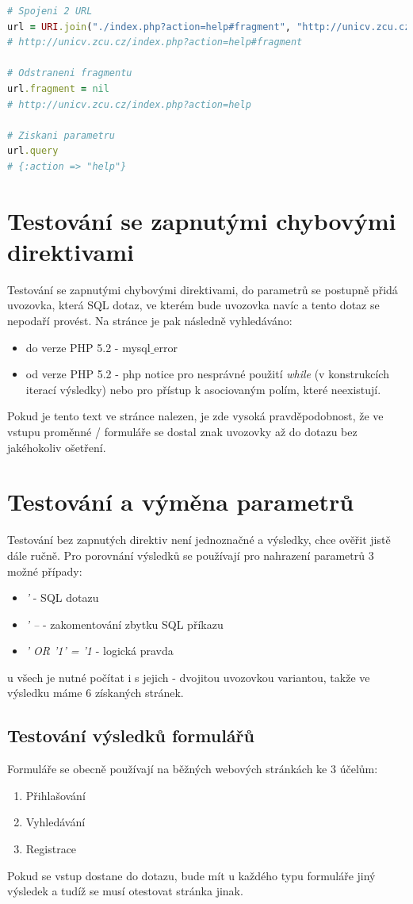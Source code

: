 \documentclass[12pt, a4paper]{report}
\begin{document}
\begin{lstlisting}[label=equals_classes,language=Ruby, caption=Normalizování URL přes uri a třídu URI]
# Spojeni 2 URL
url = URI.join("./index.php?action=help#fragment", "http://unicv.zcu.cz/") 
# http://unicv.zcu.cz/index.php?action=help#fragment

# Odstraneni fragmentu
url.fragment = nil
# http://unicv.zcu.cz/index.php?action=help

# Ziskani parametru
url.query
# {:action => "help"}
\end{lstlisting}

\section{Testování se zapnutými chybovými direktivami}
Testování se zapnutými chybovými direktivami, do parametrů se postupně přidá uvozovka, která  SQL dotaz, ve kterém bude uvozovka navíc a tento dotaz se nepodaří provést. Na stránce je pak následně vyhledáváno:
\begin{itemize}
\item do verze PHP 5.2 - mysql$\_$error
\item od verze PHP 5.2 - php notice pro nesprávné použití \textit{while} (v konstrukcích iterací výsledky) nebo pro přístup k asociovaným polím, které neexistují.
\end{itemize}
Pokud je tento text ve stránce nalezen, je zde vysoká pravděpodobnost, že ve vstupu proměnné / formuláře se dostal znak uvozovky až do dotazu bez jakéhokoliv ošetření.

\section{Testování a výměna parametrů}
Testování bez zapnutých direktiv není jednoznačné a výsledky, chce ověřit jistě dále ručně. Pro porovnání výsledků se používají pro nahrazení parametrů 3 možné případy:
\begin{itemize}
\item \textit{'} -  SQL dotazu
\item \textit{' --} - zakomentování zbytku SQL příkazu
\item \textit{' OR '1' = '1} - logická pravda
\end{itemize}
u všech je nutné počítat i s jejich  - dvojitou uvozovkou variantou, takže ve výsledku máme 6 získaných stránek.

\subsection{Testování výsledků formulářů}
Formuláře se obecně používají na běžných webových stránkách ke 3 účelům:
\begin{enumerate}
\item Přihlašování
\item Vyhledávání
\item Registrace
\end{enumerate}
Pokud se  vstup dostane do dotazu, bude mít u každého typu formuláře jiný výsledek a tudíž se musí otestovat stránka jinak.
\end{document}
